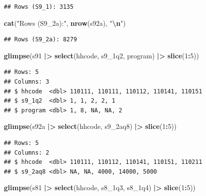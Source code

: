 \documentclass[
]{article}
\newenvironment{Shaded}{\begin{snugshade}}{\end{snugshade}}
\newcommand{\DecValTok}[1]{\textcolor[rgb]{0.00,0.00,0.81}{#1}}
\newcommand{\FunctionTok}[1]{\textcolor[rgb]{0.13,0.29,0.53}{\textbf{#1}}}
\newcommand{\NormalTok}[1]{#1}
\newcommand{\SpecialCharTok}[1]{\textcolor[rgb]{0.81,0.36,0.00}{\textbf{#1}}}
\newcommand{\StringTok}[1]{\textcolor[rgb]{0.31,0.60,0.02}{#1}}
\begin{document}
\begin{verbatim}
## Rows (S9_1): 3135
\end{verbatim}

\begin{Shaded}
\begin{Highlighting}[]
\FunctionTok{cat}\NormalTok{(}\StringTok{"Rows (S9\_2a):"}\NormalTok{, }\FunctionTok{nrow}\NormalTok{(s92a), }\StringTok{"}\SpecialCharTok{\textbackslash{}n}\StringTok{"}\NormalTok{)}
\end{Highlighting}
\end{Shaded}

\begin{verbatim}
## Rows (S9_2a): 8279
\end{verbatim}

\begin{Shaded}
\begin{Highlighting}[]
\FunctionTok{glimpse}\NormalTok{(s91 }\SpecialCharTok{|\textgreater{}} 
          \FunctionTok{select}\NormalTok{(hhcode, s9\_1q2, program) }\SpecialCharTok{|\textgreater{}} 
          \FunctionTok{slice}\NormalTok{(}\DecValTok{1}\SpecialCharTok{:}\DecValTok{5}\NormalTok{))}
\end{Highlighting}
\end{Shaded}

\begin{verbatim}
## Rows: 5
## Columns: 3
## $ hhcode  <dbl> 110111, 110111, 110112, 110141, 110151
## $ s9_1q2  <dbl> 1, 1, 2, 2, 1
## $ program <dbl> 1, 8, NA, NA, 2
\end{verbatim}

\begin{Shaded}
\begin{Highlighting}[]
\FunctionTok{glimpse}\NormalTok{(s92a }\SpecialCharTok{|\textgreater{}} 
          \FunctionTok{select}\NormalTok{(hhcode, s9\_2aq8) }\SpecialCharTok{|\textgreater{}} 
          \FunctionTok{slice}\NormalTok{(}\DecValTok{1}\SpecialCharTok{:}\DecValTok{5}\NormalTok{))}
\end{Highlighting}
\end{Shaded}

\begin{verbatim}
## Rows: 5
## Columns: 2
## $ hhcode  <dbl> 110111, 110112, 110141, 110151, 110211
## $ s9_2aq8 <dbl> NA, NA, 4000, 14000, 5000
\end{verbatim}

\begin{Shaded}
\begin{Highlighting}[]
\FunctionTok{glimpse}\NormalTok{(s81 }\SpecialCharTok{|\textgreater{}} 
          \FunctionTok{select}\NormalTok{(hhcode, s8\_1q3, s8\_1q4) }\SpecialCharTok{|\textgreater{}} 
          \FunctionTok{slice}\NormalTok{(}\DecValTok{1}\SpecialCharTok{:}\DecValTok{5}\NormalTok{))}
\end{Highlighting}
\end{Shaded}
\end{document}

